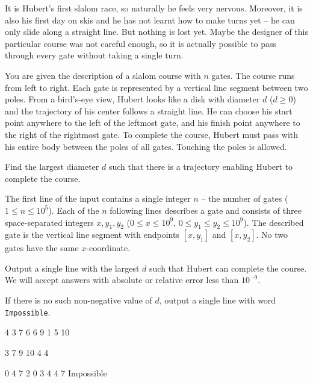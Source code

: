 





It is Hubert's first slalom race, so naturally he feels very nervous. Moreover,
it is also his first day on skis and he has not learnt how to make turns yet --
he can only slide along a straight line. But nothing is lost yet. Maybe the
designer of this particular course was not careful enough, so it is actually
possible to pass through every gate without taking a single turn.



You are given the description of a slalom course with $n$ gates. The course runs
from left to right. Each gate is represented by a vertical line segment between
two poles. From a bird's-eye view, Hubert looks like a disk with diameter $d$
($d \geq 0$) and the trajectory of his center follows a straight line. He can
choose his start point anywhere to the left of the leftmost gate, and his finish
point anywhere to the right of the rightmost gate. To complete the course,
Hubert must pass with his entire body between the poles of all gates. Touching
the poles is allowed.

Find the largest diameter $d$ such that there is a trajectory enabling Hubert to
complete the course.



The first line of the input contains a single integer $n$ -- the number of gates
($1 \leq n \leq 10^5$). Each of the $n$ following lines describes a gate and
consists of three space-separated integers $x, y_1, y_2$ ($0 \leq x \leq 10^9$,
$0 \leq y_1 \leq y_2 \leq 10^9$). The described gate is the vertical line
segment with endpoints $[x, y_1]$ and $[x, y_2]$. No two gates have the same
$x$-coordinate.



Output a single line with the largest $d$ such that Hubert can complete the
course. We will accept answers with absolute or relative error less than
$10^{-9}$.

If there is no such non-negative value of $d$, output a single line with word
\texttt{Impossible}.



4 3 7
6 6 9
1 5 10
\sampleEND

3 7 9
10 4 4
\sampleEND

0 4 7
2 0 3
4 4 7
\sampleOUT
Impossible
\sampleEND



